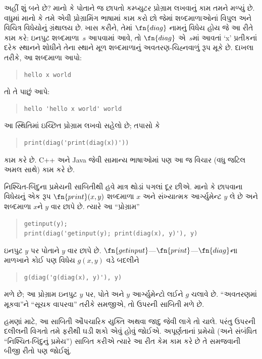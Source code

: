 \begin{explain}
અહીં શું બને છે? માનો કે પોતાને જ છાપતો કમ્પ્યુટર પ્રોગ્રામ
લખવાનું કામ તમને મળ્યું છે. વધુમાં માનો કે તમે એવી
પ્રોગ્રામિંગ ભાષામાં કામ કરો છો જેમાં શબ્દમાળાઓનાં વિપુલ
અને વિચિત્ર વિધેયોનું ગ્રંથાલય છે. ખાસ કરીને, તેમાં
$\fn{diag}$ નામનું વિધેય હોય જે આ રીતે કામ કરે:
ઇનપુટ શબ્દમાળા~$s$ આપવામાં આવે, તો $\fn{diag}$ એ~$s$માં
આવતાં `x' પ્રતીકનાં દરેક સ્થાનને શોધીને તેના સ્થાને
મૂળ શબ્દમાળાનું અવતરણ-ચિહ્નવાળું
રૂપ મૂકે છે. દાખલા તરીકે, આ શબ્દમાળા આપો:
\begin{quote}
\begin{verbatim}
hello x world
\end{verbatim}
\end{quote}
તો તે પાછું આપે:
\begin{quote}
\begin{verbatim}
hello 'hello x world' world
\end{verbatim}
\end{quote}
આ સ્થિતિમાં ઇચ્છિત પ્રોગ્રામ લખવો સહેલો છે; તપાસો કે
\begin{quote}
\begin{verbatim}
print(diag('print(diag(x))'))
\end{verbatim}
\end{quote}
કામ કરે છે. C++ અને Java જેવી સામાન્ય ભાષાઓમાં પણ
આ જ વિચાર (વધુ જટિલ અમલ સાથે) કામ કરે છે.

નિશ્ચિત-બિંદુના પ્રમેયની સાબિતીથી હવે માત્ર થોડાં પગલાં
દૂર છીએ. માનો કે છાપવાના વિધેયનું એક રૂપ
$\fn{print}(x,y)$ શબ્દમાળા $x$ અને સંખ્યાત્મક આર્ગ્યુમેન્ટ
$y$ લે છે અને શબ્દમાળા $x$ને $y$ વાર છાપે છે. ત્યારે આ
``પ્રોગ્રામ''
\begin{quote}
\begin{verbatim}
getinput(y);
print(diag('getinput(y); print(diag(x), y)'), y)
\end{verbatim}
\end{quote}
ઇનપુટ $y$ પર પોતાને $y$ વાર છાપે છે.
$\fn{getinput}$---$\fn{print}$---$\fn{diag}$ના માળખાને
કોઈ પણ વિધેય $g(x,y)$ વડે બદલીને
\begin{quote}
\begin{verbatim}
g(diag('g(diag(x), y)'), y)
\end{verbatim}
\end{quote}
મળે છે; આ પ્રોગ્રામ ઇનપુટ $y$ પર, પોતે અને $y$
આર્ગ્યુમેન્ટો લઈને $g$ ચલાવે છે. ``અવતરણમાં મૂકવા''ને
``સૂચક વાપરવા'' તરીકે સમજીએ, તો ઉપરની સાબિતી મળે છે.

હમણાં માટે, આ સાબિતી ઔપચારિક યુક્તિ અથવા જાદુ જેવી
લાગે તો ચાલે. પરંતુ ઉપરની દલીલની વિગતો તમે ફરીથી
ઘડી શકો એવું હોવું જોઈએ. અપૂર્ણતાનાં પ્રમેયો (અને
સંબંધિત ``નિશ્ચિત-બિંદુનું પ્રમેય'') સાબિત કરીએ ત્યારે
આ રીત કેમ કામ કરે છે તે સમજવાની બીજી રીતો પણ જોઈશું.
\end{explain}

